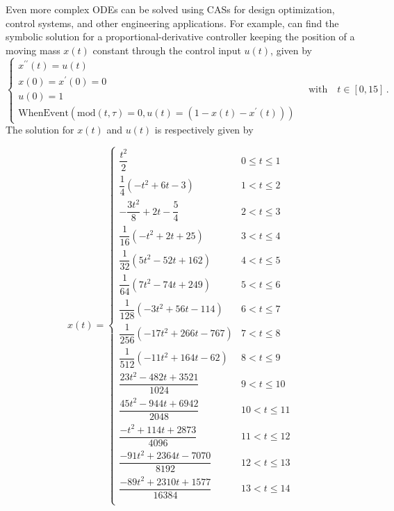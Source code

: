 \begin{example}
Even more complex \acp{ODE} can be solved using \acp{CAS} for design optimization, control systems, and other engineering applications. For example, \Mathematica{} can find the symbolic solution for a proportional-derivative controller keeping the position of a moving mass $x(t)$ constant through the control input $u(t)$, given by
%
\begin{equation*}
  \begin{cases}
    x^{\prime\prime}(t) = u(t) \\[0.1em]
    x(0) = x^{\prime}(0) = 0 \\[0.1em]
    u(0) = 1 \\[0.1em]
    \mathrm{WhenEvent}(\mathrm{mod}(t, \tau) = 0, u(t) = (1 - x(t) - x^{\prime}(t)))
  \end{cases}
  \quad \text{with} \quad t \in [0, 15] \, \text{.}
\end{equation*}
%
The solution for $x(t)$ and $u(t)$ is respectively given by
%
\begin{footnotesize}
  \begin{equation*}
    x(t) = \begin{cases}
      \dfrac{t^2}{2} & 0\leq t\leq 1 \\[0.2em]
      \dfrac{1}{4} \left(-t^2+6 t-3\right) & 1<t\leq 2 \\[0.2em]
      -\dfrac{3 t^2}{8}+2 t-\dfrac{5}{4} & 2<t\leq 3 \\[0.2em]
      \dfrac{1}{16} \left(-t^2+2 t+25\right) & 3<t\leq 4 \\[0.2em]
      \dfrac{1}{32} \left(5 t^2-52 t+162\right) & 4<t\leq 5 \\[0.2em]
      \dfrac{1}{64} \left(7 t^2-74 t+249\right) & 5<t\leq 6 \\[0.2em]
      \dfrac{1}{128} \left(-3 t^2+56 t-114\right) & 6<t\leq 7 \\[0.2em]
      \dfrac{1}{256} \left(-17 t^2+266 t-767\right) & 7<t\leq 8 \\[0.2em]
      \dfrac{1}{512} \left(-11 t^2+164 t-62\right) & 8<t\leq 9 \\[0.2em]
      \dfrac{23 t^2-482 t+3521}{1024} & 9<t\leq 10 \\[0.2em]
      \dfrac{45 t^2-944 t+6942}{2048} & 10<t\leq 11 \\[0.2em]
      \dfrac{-t^2+114 t+2873}{4096} & 11<t\leq 12 \\[0.2em]
      \dfrac{-91 t^2+2364 t-7070}{8192} & 12<t\leq 13 \\[0.2em]
      \dfrac{-89 t^2+2310 t+1577}{16384} & 13<t\leq 14 \\[0.2em]

\end{cases}
\end{equation*}
\end{footnotesize}
\end{example}
